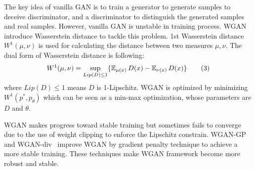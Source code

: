 The key idea of vanilla GAN is to train a generator to generate samples to deceive discriminator, and a discriminator to distinguish the generated samples and real samples. However, vanilla GAN is unstable in training process. WGAN introduce Wasserstein distance to tackle this problem. 1st Wasserstein distance $W^1(\mu, \nu)$ is used for calculating the distance between two measures $\mu, \nu$. The dual form of Wasserstein distance is following:
\begin{align*} \label{eq:Wasserstein-distance}
W^1(\mu, \nu) = \sup_{Lip(D) \leq 1} \{\operatorname{\mathbb{E}}_{\mu(x)} D(x)  - \operatorname{\mathbb{E}}_{\nu(x)} D(x)\} \tag{3}
\end{align*}
where $Lip(D) \leq 1$ means $D$ is 1-Lipschitz. WGAN is optimized by minimizing $W^1(p^*, p_\theta)$ which can be seen as a min-max optimization, whose parameters are $D$ and $\theta$. 

WGAN makes progress toward stable training but sometimes fails to converge due to the use of weight clipping to enforce the Lipschitz constrain. WGAN-GP~\cite{gulrajani2017improved} and WGAN-div~\cite{wu2018wasserstein} improve WGAN by gradient penalty technique to achieve a more stable training. These techniques make WGAN framework become more robust and stable. 
